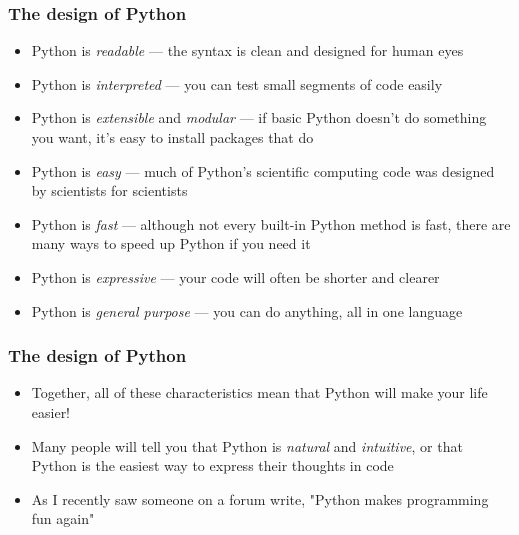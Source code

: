 \documentclass{beamer}
\begin{document}
\begin{frame}
\frametitle{The design of Python}

\begin{itemize}
	\item Python is \emph{readable} --- the syntax is clean and designed for human eyes

	\item Python is \emph{interpreted} --- you can test small segments of code easily 

	\item Python is \emph{extensible} and \emph{modular} --- if basic Python doesn't do something you want, it's easy to install packages that do

	\item Python is \emph{easy} --- much of Python's scientific computing code was designed by scientists for scientists

	\item Python is \emph{fast} --- although not every built-in Python method is fast, there are many ways to speed up Python if you need it

	\item Python is \emph{expressive} --- your code will often be shorter and clearer
	
	\item Python is \emph{general purpose} --- you can do anything, all in one language
\end{itemize}
\end{frame}

\begin{frame}
\frametitle{The design of Python}
\begin{itemize}
	\item Together, all of these characteristics mean that Python will make your life easier!

	\item Many people will tell you that Python is \emph{natural} and \emph{intuitive}, or that Python is the easiest way to express their thoughts in code
	
	\item As I recently saw someone on a forum write, "Python makes programming fun again"

\end{itemize}
\end{frame}
\end{document}
